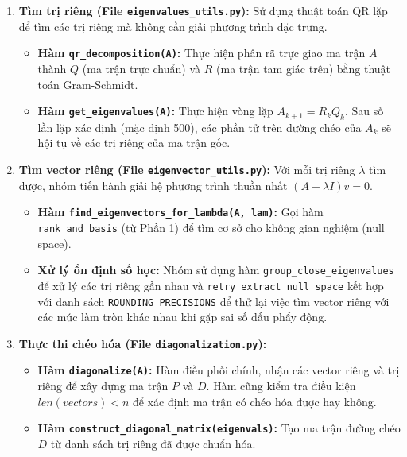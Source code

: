 \documentclass[12pt,a4paper]{article}
\begin{document}
\begin{enumerate}[label=\textbf{\alph*)}]
    \item \textbf{Tìm trị riêng (File \texttt{eigenvalues\_utils.py}):} 
    Sử dụng thuật toán QR lặp để tìm các trị riêng mà không cần giải phương trình đặc trưng.
    \begin{itemize}
        \item \textbf{Hàm \texttt{qr\_decomposition(A)}:} Thực hiện phân rã trực giao ma trận $A$ thành $Q$ (ma trận trực chuẩn) và $R$ (ma trận tam giác trên) bằng thuật toán Gram-Schmidt.
        \item \textbf{Hàm \texttt{get\_eigenvalues(A)}:} Thực hiện vòng lặp $A_{k+1} = R_k Q_k$. Sau số lần lặp xác định (mặc định 500), các phần tử trên đường chéo của $A_k$ sẽ hội tụ về các trị riêng của ma trận gốc.
    \end{itemize}

    \item \textbf{Tìm vector riêng (File \texttt{eigenvector\_utils.py}):}
    Với mỗi trị riêng $\lambda$ tìm được, nhóm tiến hành giải hệ phương trình thuần nhất $(A - \lambda I)v = 0$.
    \begin{itemize}
        \item \textbf{Hàm \texttt{find\_eigenvectors\_for\_lambda(A, lam)}:} Gọi hàm \texttt{rank\_and\_basis} (từ Phần 1) để tìm cơ sở cho không gian nghiệm (null space).
        \item \textbf{Xử lý ổn định số học:} Nhóm sử dụng hàm \texttt{group\_close\_eigenvalues} để xử lý các trị riêng gần nhau và \texttt{retry\_extract\_null\_space} kết hợp với danh sách \texttt{ROUNDING\_PRECISIONS} để thử lại việc tìm vector riêng với các mức làm tròn khác nhau khi gặp sai số dấu phẩy động.
    \end{itemize}

    \item \textbf{Thực thi chéo hóa (File \texttt{diagonalization.py}):}
    \begin{itemize}
        \item \textbf{Hàm \texttt{diagonalize(A)}:} Hàm điều phối chính, nhận các vector riêng và trị riêng để xây dựng ma trận $P$ và $D$. Hàm cũng kiểm tra điều kiện $len(vectors) < n$ để xác định ma trận có chéo hóa được hay không.
        \item \textbf{Hàm \texttt{construct\_diagonal\_matrix(eigenvals)}:} Tạo ma trận đường chéo $D$ từ danh sách trị riêng đã được chuẩn hóa.
    \end{itemize}
\end{enumerate}
\end{document}
